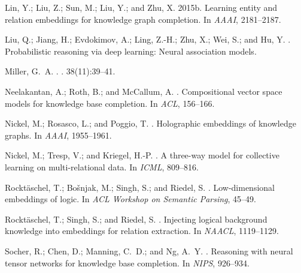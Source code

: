 \documentclass[letterpaper]{article} \usepackage{aaai18}  \usepackage{times}  \usepackage{helvet}  \usepackage{courier}  \usepackage{url}  \usepackage{graphicx}  \usepackage{amsmath}
\begin{document}
\begin{thebibliography}{}
Lin, Y.; Liu, Z.; Sun, M.; Liu, Y.; and Zhu, X.
\newblock 2015b.
\newblock Learning entity and relation embeddings for knowledge graph
  completion.
\newblock In {\em AAAI},  2181--2187.

Liu, Q.; Jiang, H.; Evdokimov, A.; Ling, Z.-H.; Zhu, X.; Wei, S.; and Hu, Y.
.
\newblock Probabilistic reasoning via deep learning: Neural association models.

Miller, G.~A.
.
.
 38(11):39--41.

Neelakantan, A.; Roth, B.; and McCallum, A.
.
\newblock Compositional vector space models for knowledge base completion.
\newblock In {\em ACL},  156--166.

Nickel, M.; Rosasco, L.; and Poggio, T.
.
\newblock Holographic embeddings of knowledge graphs.
\newblock In {\em AAAI},  1955--1961.

Nickel, M.; Tresp, V.; and Kriegel, H.-P.
.
\newblock A three-way model for collective learning on multi-relational data.
\newblock In {\em ICML},  809--816.

Rockt\"{a}schel, T.; Bo\v{s}njak, M.; Singh, S.; and Riedel, S.
.
\newblock Low-dimensional embeddings of logic.
\newblock In {\em ACL Workshop on Semantic Parsing},  45--49.

Rockt\"{a}schel, T.; Singh, S.; and Riedel, S.
.
\newblock Injecting logical background knowledge into embeddings for relation
  extraction.
\newblock In {\em NAACL},  1119--1129.

Socher, R.; Chen, D.; Manning, C.~D.; and Ng, A.~Y.
.
\newblock Reasoning with neural tensor networks for knowledge base completion.
\newblock In {\em NIPS},  926--934.


\end{thebibliography}
\end{document}
